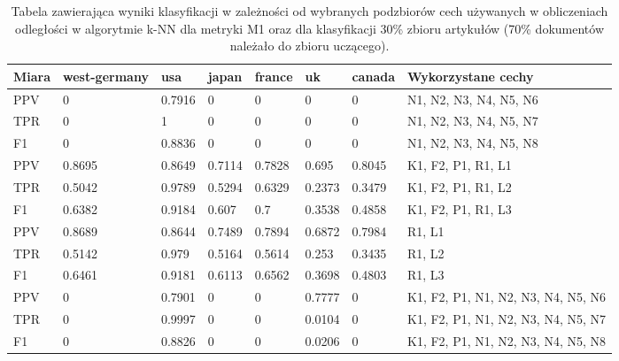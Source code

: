 \documentclass{classrep}
\begin{document}
\begin{table}[H]
    \centering
\caption{Tabela zawierająca wyniki klasyfikacji w zależności od wybranych podzbiorów cech używanych w obliczeniach odległości w algorytmie k-NN dla metryki M1 oraz dla klasyfikacji 30\% zbioru artykułów (70\% dokumentów należało do zbioru uczącego).}
\begin{adjustbox}{max width=\textwidth}
    \begin{tabular}{|l|l|l|l|l|l|l|l|}
    \hline
        Miara & west-germany  & usa  & japan & france & uk & canada & Wykorzystane cechy \\ \hline
        PPV & 0 & 0.7916 & 0 & 0 & 0 & 0 & N1, N2, N3, N4, N5, N6 \\ \hline
        TPR & 0 & 1 & 0 & 0 & 0 & 0 & N1, N2, N3, N4, N5, N7 \\ \hline
        F1 & 0 & 0.8836 & 0 & 0 & 0 & 0 & N1, N2, N3, N4, N5, N8 \\ \hline
        PPV & 0.8695 & 0.8649 & 0.7114 & 0.7828 & 0.695 & 0.8045 & K1, F2, P1, R1, L1 \\ \hline
        TPR & 0.5042 & 0.9789 & 0.5294 & 0.6329 & 0.2373 & 0.3479 & K1, F2, P1, R1, L2 \\ \hline
        F1 & 0.6382 & 0.9184 & 0.607 & 0.7 & 0.3538 & 0.4858 & K1, F2, P1, R1, L3 \\ \hline
        PPV & 0.8689 & 0.8644 & 0.7489 & 0.7894 & 0.6872 & 0.7984 & R1, L1 \\ \hline
        TPR & 0.5142 & 0.979 & 0.5164 & 0.5614 & 0.253 & 0.3435 & R1, L2 \\ \hline
        F1 & 0.6461 & 0.9181 & 0.6113 & 0.6562 & 0.3698 & 0.4803 & R1, L3 \\ \hline
        PPV & 0 & 0.7901 & 0 & 0 & 0.7777 & 0 & K1, F2, P1, N1, N2, N3, N4, N5, N6 \\ \hline
        TPR & 0 & 0.9997 & 0 & 0 & 0.0104 & 0 & K1, F2, P1, N1, N2, N3, N4, N5, N7 \\ \hline
        F1 & 0 & 0.8826 & 0 & 0 & 0.0206 & 0 & K1, F2, P1, N1, N2, N3, N4, N5, N8 \\ \hline
    \end{tabular}
\end{adjustbox}
\end{table}
\end{document}
